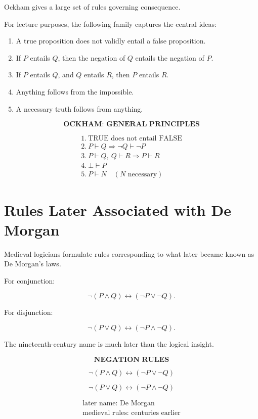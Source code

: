 \documentclass[11pt]{article}
\begin{document}
Ockham gives a large set of rules governing consequence.

For lecture purposes, the following family captures the central
ideas:

\begin{enumerate}
    \item A true proposition does not validly entail a false proposition.
    \item If \(P\) entails \(Q\), then the negation of \(Q\) entails the negation of \(P\).
    \item If \(P\) entails \(Q\), and \(Q\) entails \(R\), then \(P\) entails \(R\).
    \item Anything follows from the impossible.
    \item A necessary truth follows from anything.
\end{enumerate}

\begin{whiteboard}
\[
\textbf{OCKHAM: GENERAL PRINCIPLES}
\]

\[
\begin{array}{l}
1.\ \text{TRUE does not entail FALSE}\\[0.4em]
2.\ P\vdash Q \Rightarrow \neg Q \vdash \neg P\\[0.4em]
3.\ P\vdash Q,\ Q\vdash R \Rightarrow P\vdash R\\[0.4em]
4.\ \bot \vdash P\\[0.4em]
5.\ P\vdash N \quad (N\text{ necessary})
\end{array}
\]
\end{whiteboard}

\section{Rules Later Associated with De Morgan}

Medieval logicians formulate rules corresponding to what later
became known as De Morgan's laws.

For conjunction:

\[
\neg(P\land Q)
\leftrightarrow
(\neg P\lor \neg Q).
\]

For disjunction:

\[
\neg(P\lor Q)
\leftrightarrow
(\neg P\land \neg Q).
\]

The nineteenth-century name is much later than the logical
insight.

\begin{whiteboard}
\[
\textbf{NEGATION RULES}
\]

\[
\neg(P\land Q)
\leftrightarrow
(\neg P\lor \neg Q)
\]

\[
\neg(P\lor Q)
\leftrightarrow
(\neg P\land \neg Q)
\]

\[
\boxed{
\begin{array}{c}
\text{later name: De Morgan}\\
\text{medieval rules: centuries earlier}
\end{array}
}
\]
\end{whiteboard}
\end{document}
